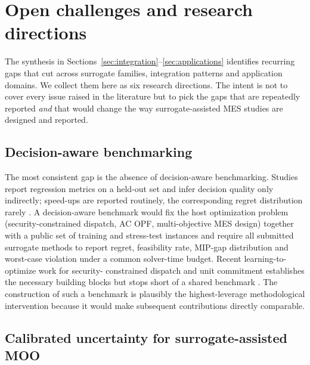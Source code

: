 \section{Open challenges and research directions}
\label{sec:challenges}

The synthesis in Sections~\ref{sec:integration}--\ref{sec:applications}
identifies recurring gaps that cut across surrogate families,
integration patterns and application domains. We collect them here as
six research directions. The intent is not to cover every issue raised
in the literature but to pick the gaps that are repeatedly reported
\emph{and} that would change the way surrogate-assisted MES studies
are designed and reported.

\subsection{Decision-aware benchmarking}
\label{sec:ch:bench}

The most consistent gap is the absence of decision-aware benchmarking.
Studies report regression metrics on a held-out set and infer
decision quality only indirectly; speed-ups are reported routinely,
the corresponding regret distribution rarely
\cite{Mylonopoulos202332697,Ruan2021221,Khaloie2025,Lim2025,Starke2025214,Perera2019191}.
A decision-aware benchmark would fix the host optimization problem
(security-constrained dispatch, AC OPF, multi-objective MES design)
together with a public set of training and stress-test instances and
require all submitted surrogate methods to report regret, feasibility
rate, MIP-gap distribution and worst-case violation under a common
solver-time budget. Recent learning-to-optimize work for security-
constrained dispatch and unit commitment establishes the necessary
building blocks but stops short of a shared benchmark
\cite{Wu2022231,Chen20244723,Chen2022,Wu2024391,Liang20246508}. The
construction of such a benchmark is plausibly the highest-leverage
methodological intervention because it would make subsequent
contributions directly comparable.

\subsection{Calibrated uncertainty for surrogate-assisted MOO}
\label{sec:ch:uq}

